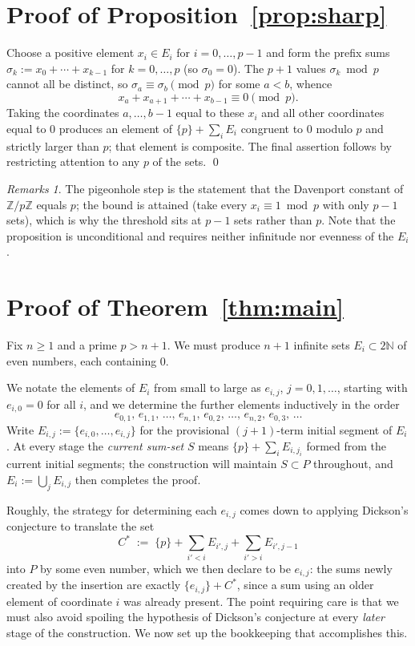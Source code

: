 \documentclass[11pt]{amsart}
\theoremstyle{remark}
\newtheorem*{remarks}{Remarks}
\newcommand{\NN}{\mathbb{N}}
\newcommand{\PP}{P}
\begin{document}
\section{Proof of Proposition~\ref{prop:sharp}}

Choose a positive element $x_i\in E_i$ for $i=0,\dots,p-1$ and form
the prefix sums $\sigma_k := x_0+\cdots+x_{k-1}$ for $k=0,\dots,p$
(so $\sigma_0=0$).  The $p+1$ values $\sigma_k \bmod p$ cannot all be
distinct, so $\sigma_a\equiv\sigma_b \pmod p$ for some $a<b$, whence
\[
x_a + x_{a+1} + \cdots + x_{b-1} \equiv 0 \pmod p .
\]
Taking the coordinates $a,\dots,b-1$ equal to these $x_i$ and all
other coordinates equal to $0$ produces an element of
$\{p\}+\sum_i E_i$ congruent to $0$ modulo $p$ and strictly larger
than $p$; that element is composite.  The final assertion follows by
restricting attention to any $p$ of the sets.  \qed

\begin{remarks}
The pigeonhole step is the statement that the Davenport constant of
$\mathbb{Z}/p\mathbb{Z}$ equals $p$; the bound is attained (take every
$x_i\equiv 1 \bmod p$ with only $p-1$ sets), which is why the
threshold sits at $p-1$ sets rather than $p$.  Note that the
proposition is unconditional and requires neither infinitude nor
evenness of the $E_i$.
\end{remarks}

\section{Proof of Theorem~\ref{thm:main}}

Fix $n\ge 1$ and a prime $p>n+1$.  We must produce $n+1$ infinite sets
$E_i\subset 2\NN$ of even numbers, each containing $0$.

We notate the elements of $E_i$ from small to large as $e_{i,j}$,
$j=0,1,\dots$, starting with $e_{i,0}=0$ for all $i$, and we determine
the further elements inductively in the order
\[
e_{0,1},\,e_{1,1},\,\dots,\,e_{n,1},\,e_{0,2},\,\dots,\,e_{n,2},\,
e_{0,3},\,\dots
\]
Write $E_{i,j}:=\{e_{i,0},\dots,e_{i,j}\}$ for the provisional
$(j+1)$-term initial segment of $E_i$.  At every stage the
\emph{current sum-set} $S$ means $\{p\}+\sum_i E_{i,j_i}$ formed from
the current initial segments; the construction will maintain
$S\subset\PP$ throughout, and $E_i:=\bigcup_j E_{i,j}$ then completes
the proof.

Roughly, the strategy for determining each $e_{i,j}$ comes down to
applying Dickson's conjecture to translate the set
\[
C^\ast \;:=\; \{p\}+\sum_{i'<i}E_{i',j}+\sum_{i'>i}E_{i',j-1}
\]
into $\PP$ by some even number, which we then declare to be $e_{i,j}$:
the sums newly created by the insertion are exactly
$\{e_{i,j}\}+C^\ast$, since a sum using an older element of coordinate
$i$ was already present.  The point requiring care is that we must
also avoid spoiling the hypothesis of Dickson's conjecture at every
\emph{later} stage of the construction.  We now set up the
bookkeeping that accomplishes this.
\end{document}
